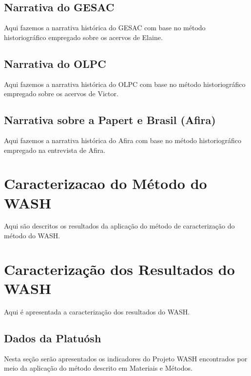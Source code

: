 \documentclass[
12pt,		%
openright,	%
twoside,  %
a4paper,			%
chapter=TITLE,		%
english,			%
french,				%
spanish,			%
brazil				%
]{USPSC-classe/USPSC}
\begin{document}
\subsection[Narrativa do GESAC]{Narrativa do GESAC}\label{Narrativa do GESAC}
Aqui fazemos a narrativa hist\'orica do GESAC com base no m\'etodo historiogr\'afico empregado sobre os acervos de Elaine.


\subsection[Narrativa do OLPC]{Narrativa do OLPC}\label{Narrativa do OLPC}
Aqui fazemos a narrativa hist\'orica do OLPC com base no m\'etodo historiogr\'afico empregado sobre os acervos de Victor.


\subsection[Narrativa sobre a Papert e Brasil (Afira)]{Narrativa sobre a Papert e Brasil (Afira)}\label{Narrativa sobre a Papert e Brasil (Afira)}
Aqui fazemos a narrativa hist\'orica do Afira com base no m\'etodo historiogr\'afico empregado na entrevista de Afira.


\section[Caracterizacao do M\'etodo do WASH]{Caracterizacao do M\'etodo do WASH}\label{Caracterizacao do M\'etodo do WASH}
Aqui s\~ao descritos os resultados da aplica\c{c}\~ao do m\'etodo de caracteriza\c{c}\~ao do m\'etodo do WASH.


\section[Caracteriza\c{c}\~ao dos Resultados do WASH]{Caracteriza\c{c}\~ao dos Resultados do WASH}\label{Caracteriza\c{c}\~ao dos Resultados do WASH}
Aqui \'e apresentada a caracteriza\c{c}\~ao dos resultados do WASH.


\subsection[Dados da Platu\'osh]{Dados da Platu\'osh}\label{Dados da Platu\'osh}
Nesta se\c{c}\~ao ser\~ao apresentados os indicadores do Projeto WASH encontrados por meio da aplica\c{c}\~ao do m\'etodo descrito em Materiais e M\'etodos.
\end{document}
